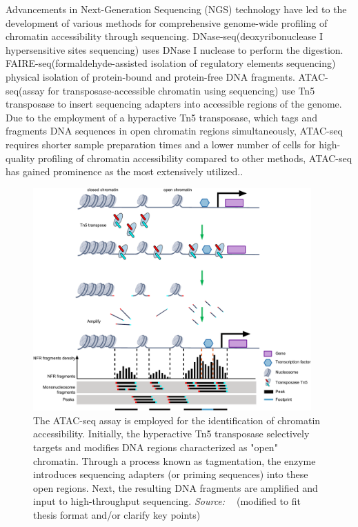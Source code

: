 Advancements in Next-Generation Sequencing (NGS) technology have led to the development of various methods for comprehensive genome-wide profiling of chromatin accessibility through sequencing. DNase-seq(deoxyribonuclease I hypersensitive sites sequencing)\citep{boyle2008dnasseq} uses DNase I nuclease to perform the digestion. FAIRE-seq(formaldehyde-assisted isolation of regulatory elements sequencing)\citep{giresi2007faireseq} physical isolation of protein-bound and protein-free DNA fragments. ATAC-seq(assay for transposase-accessible chromatin using sequencing)\citep{buenrostro2013atacseq} use Tn5 transposase to insert sequencing adapters into accessible regions of the genome. Due to the employment of a hyperactive Tn5 transposase, which tags and fragments DNA sequences in open chromatin regions simultaneously, ATAC-seq requires shorter sample preparation times and a lower number of cells for high-quality profiling of chromatin accessibility compared to other methods, ATAC-seq has gained prominence as the most extensively utilized.\citep{minnoye2021chromatin}.

\begin{figure}[!ht]
	\centering
	\includegraphics[width=0.95\textwidth]{scATAC-seq/fig}
	\vspace{0.1cm}
	\caption[ATAC sequenceing schematic flow.]{The ATAC-seq assay is employed for the identification of chromatin accessibility. Initially, the hyperactive Tn5 transposase selectively targets and modifies DNA regions characterized as "open" chromatin. Through a process known as tagmentation, the enzyme introduces sequencing adapters (or priming sequences) into these open regions. Next, the resulting DNA fragments are amplified and input to high-throughput sequencing. \emph{Source: ~\cite{yan2020reads}} (modified to fit thesis format and/or clarify key points)}
	\label{fig:ATAC-seq}
\end{figure}


